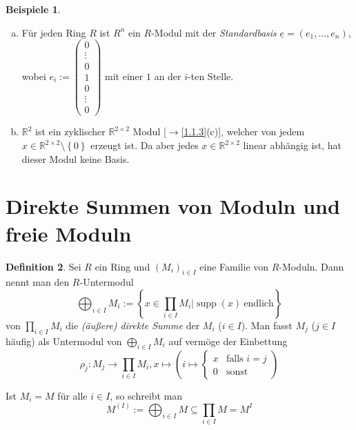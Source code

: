 \documentclass[
twoside=semi,
fontsize=12,
DIV=12, 
cleardoublepage=current,
leqno,
headings=optiontoheadandtoc, 
toc=idx
]{scrbook}
\newcommand{\R}{\mathbb{R}}
\newcommand{\brac}[1]{\left( #1 \right)}
\newcommand{\set}[1]{\left\{ #1 \right\}}
\DeclareMathOperator{\supp}{supp}
\theoremstyle{definition}
\newtheorem{definition}{Definition}[section]
\newtheorem{beispiele}[definition]{Beispiele}
\begin{document}
	\begin{beispiele}\label{1.1.7}
		\begin{enumerate}[(a)]
			\item F\"ur jeden Ring $R$ ist $R^n$ ein $R$-Modul mit der \emph{Standardbasis} $\underline{e} = (e_1, \dots, e_n)$, wobei $e_i := \begin{pmatrix}
				0\\
				\vdots\\
				0\\
				1\\
				0\\
				\vdots\\
				0
			\end{pmatrix}$ mit einer $1$ an der $i$-ten Stelle.
		
			\item $\R^2$ ist ein zyklischer $\R^{2 \times 2}$ Modul [$\to$\ref{1.1.3}(c)], welcher von jedem $x \in \R^{2\times 2} \setminus \set{0}$ erzeugt ist. Da aber jedes $x \in \R^{2 \times 2}$ linear abh\"angig ist, hat dieser Modul keine Basis.  
		\end{enumerate}
	\end{beispiele}
	\newpage

	\section{Direkte Summen von Moduln und freie Moduln}
	\begin{definition}\label{1.2.1}
		Sei $R$ ein Ring und $(M_i)_{i \in I}$ eine Familie von $R$-Moduln. Dann nennt man den $R$-Untermodul 
			\[\bigoplus_{i \in I} M_i := \set{x \in \prod_{i\in I}M_i| \supp(x)\ \mathrm{endlich} } \]
		von $\displaystyle\prod_{i\in I} M_i$ die \emph{(\"au\ss ere) direkte Summe} der $M_i$ ($i \in I$). Man fasst $M_j$ ($j \in I$ h\"aufig) als Untermodul von $\displaystyle\bigoplus_{i \in I} M_i$ auf verm\"oge der Einbettung 
		 \[\rho_j:M_j \to \prod_{i\in I} M_i, x \mapsto \brac{i \mapsto \begin{cases}
		 		x & \textrm{falls } i = j\\
		 		0 & \textrm{sonst}
		 \end{cases}}\] 
	 	
	 	\noindent Ist $M_i = M$ f\"ur alle $i \in I$, so schreibt man \[M^{(I)} := \bigoplus_{i \in I} M \subseteq \prod_{i\in I} M = M^I\]
	\end{definition}
	
\end{document}
